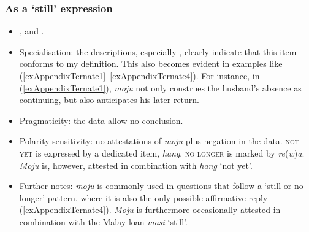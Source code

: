 \subsubsection{As a \lq{}still\rq{ }expression}
\label{appendixTernateTidoreStill}
\begin{itemize}
	\item \textcite[92–93]{Hayami2001}, \textcite[32]{PikkertEtal1994} and \textcite[145, 228, 242–243]{vanStaden2000}.
	\item Specialisation: the descriptions, especially \textcite[92]{Hayami2001}, clearly indicate that this item conforms to my definition. This also becomes evident in examples like (\ref{exAppendixTernate1}–\ref{exAppendixTernate4}). For instance, in (\ref{exAppendixTernate1}), \textit{moju} not only construes the husband's absence as continuing, but also anticipates his later return.
	\item Pragmaticity: the data allow no conclusion.
	\item Polarity sensitivity: no attestations of \textit{moju} plus negation in the data. \textsc{not yet} is expressed by a dedicated item, \textit{hang}. \textsc{no longer} is marked by \mbox{\textit{re}(\textit{w})\textit{a}}. \textit{Moju} is, however, attested in combination with \textit{hang} \lq not yet'.
	\item Further notes: \textit{moju} is commonly used in questions that follow a \lq still or no longer' pattern, where it is also the only possible affirmative reply (\ref{exAppendixTernate4}). \textit{Moju} is furthermore occasionally attested in combination with the Malay loan \textit{masi} \lq still'.
\end{itemize}

